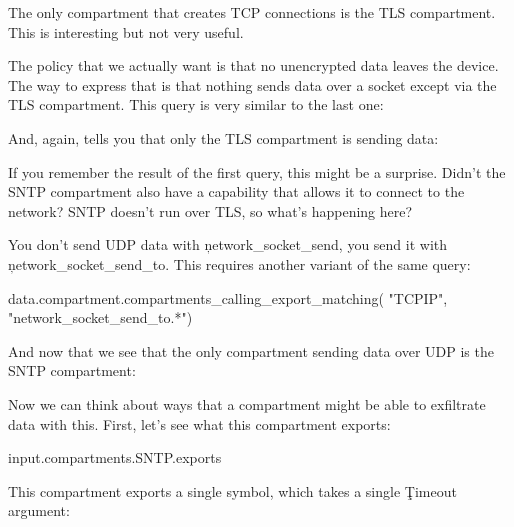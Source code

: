 \begin{jsonsnippet}
[
  "TLS"
]
\end{jsonsnippet}

The only compartment that creates TCP connections is the TLS compartment.
This is interesting but not very useful.

The policy that we actually want is that no unencrypted data leaves the device.
The way to express that is that nothing sends data over a socket except via the TLS compartment.
This query is very similar to the last one:


And, again, tells you that only the TLS compartment is sending data:

\begin{jsonsnippet}
[
  "TLS"
]
\end{jsonsnippet}

If you remember the result of the first query, this might be a surprise.
Didn't the SNTP compartment also have a capability that allows it to connect to the network?
SNTP doesn't run over TLS, so what's happening here?

You don't send UDP data with \c{network_socket_send}, you send it with \c{network_socket_send_to}.
This requires another variant of the same query:

\begin{regosnippet}
data.compartment.compartments_calling_export_matching(
	"TCPIP",
	"network_socket_send_to.*") 
\end{regosnippet}

And now that we see that the only compartment sending data over UDP is the SNTP compartment:

\begin{jsonsnippet}
[
  "SNTP"
]
\end{jsonsnippet}

Now we can think about ways that a compartment might be able to exfiltrate data with this.
First, let's see what this compartment exports:

\begin{regosnippet}
input.compartments.SNTP.exports
\end{regosnippet}

This compartment exports a single symbol, which takes a single \c{Timeout} argument:

